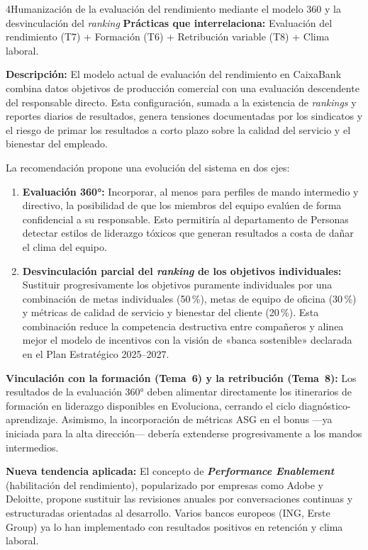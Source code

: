 \begin{recomendacion}{4}{Humanización de la evaluación del rendimiento mediante el modelo 360\textdegree{} y la desvinculación del \textit{ranking}}
\textbf{Prácticas que interrelaciona:} Evaluación del rendimiento (T7) + Formación (T6) + Retribución
variable (T8) + Clima laboral.

\medskip
\textbf{Descripción:}
El modelo actual de evaluación del rendimiento en CaixaBank combina datos
objetivos de producción comercial con una evaluación descendente del
responsable directo. Esta configuración, sumada a la existencia de
\textit{rankings} y reportes diarios de resultados, genera tensiones
documentadas por los sindicatos y el riesgo de primar los resultados
a corto plazo sobre la calidad del servicio y el bienestar del empleado.

La recomendación propone una evolución del sistema en dos ejes:
\begin{enumerate}
  \item \textbf{Evaluación 360°:} Incorporar, al menos para perfiles de mando
        intermedio y directivo, la posibilidad de que los miembros del equipo
        evalúen de forma confidencial a su responsable. Esto permitiría al
        departamento de Personas detectar estilos de liderazgo tóxicos que
        generan resultados a costa de dañar el clima del equipo.
  \item \textbf{Desvinculación parcial del \textit{ranking} de los objetivos
        individuales:} Sustituir progresivamente los objetivos puramente
        individuales por una combinación de metas individuales (50\,\%),
        metas de equipo de oficina (30\,\%) y métricas de calidad de
        servicio y bienestar del cliente (20\,\%). Esta combinación reduce
        la competencia destructiva entre compañeros y alinea mejor el
        modelo de incentivos con la visión de «banca sostenible» declarada
        en el Plan Estratégico 2025--2027.
\end{enumerate}
\textbf{Vinculación con la formación (Tema~6) y la retribución (Tema~8):}
Los resultados de la evaluación 360° deben alimentar directamente los
itinerarios de formación en liderazgo disponibles en Evoluciona, cerrando
el ciclo diagnóstico-aprendizaje. Asimismo, la incorporación de métricas
ASG en el bonus —ya iniciada para la alta dirección— debería extenderse
progresivamente a los mandos intermedios.

\medskip
\textbf{Nueva tendencia aplicada:}
El concepto de \textbf{\textit{Performance Enablement}} (habilitación del
rendimiento), popularizado por empresas como Adobe y Deloitte, propone
sustituir las revisiones anuales por conversaciones continuas y estructuradas
orientadas al desarrollo. Varios bancos europeos (ING, Erste Group) ya lo
han implementado con resultados positivos en retención y clima laboral.
\end{recomendacion}

